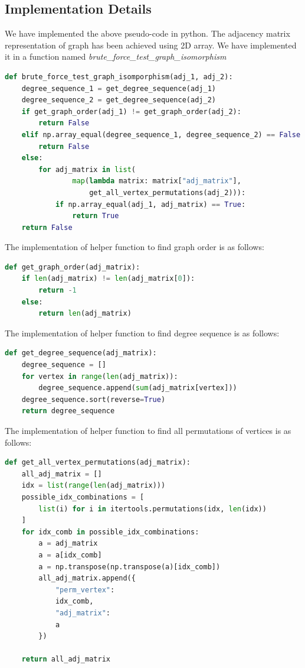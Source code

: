 \documentclass[11pt]{article}
\begin{document}
\subsection{Implementation Details}
\label{ssec:layout}
We have implemented the above pseudo-code in python. The adjacency matrix representation of graph has been achieved using 2D array. We have implemented it in a function named \textit{brute\_force\_test\_graph\_isomorphism}\\
\begin{lstlisting}[language=Python]
def brute_force_test_graph_isomporphism(adj_1, adj_2):
    degree_sequence_1 = get_degree_sequence(adj_1)
    degree_sequence_2 = get_degree_sequence(adj_2)
    if get_graph_order(adj_1) != get_graph_order(adj_2):
        return False
    elif np.array_equal(degree_sequence_1, degree_sequence_2) == False:
        return False
    else:
        for adj_matrix in list(
                map(lambda matrix: matrix["adj_matrix"],
                    get_all_vertex_permutations(adj_2))):
            if np.array_equal(adj_1, adj_matrix) == True:
                return True
    return False
\end{lstlisting}
The implementation of helper function to find graph order is as follows:
\begin{lstlisting}[language=Python]
def get_graph_order(adj_matrix):
    if len(adj_matrix) != len(adj_matrix[0]):
        return -1
    else:
        return len(adj_matrix)
\end{lstlisting}
The implementation of helper function to find degree sequence is as follows:
\begin{lstlisting}[language=Python]
def get_degree_sequence(adj_matrix):
    degree_sequence = []
    for vertex in range(len(adj_matrix)):
        degree_sequence.append(sum(adj_matrix[vertex]))
    degree_sequence.sort(reverse=True)
    return degree_sequence
\end{lstlisting}
The implementation of helper function to find all permutations of vertices is as follows:
\begin{lstlisting}[language=Python]
def get_all_vertex_permutations(adj_matrix):
    all_adj_matrix = []
    idx = list(range(len(adj_matrix)))
    possible_idx_combinations = [
        list(i) for i in itertools.permutations(idx, len(idx))
    ]
    for idx_comb in possible_idx_combinations:
        a = adj_matrix
        a = a[idx_comb]
        a = np.transpose(np.transpose(a)[idx_comb])
        all_adj_matrix.append({
            "perm_vertex":
            idx_comb,
            "adj_matrix":
            a
        })

    return all_adj_matrix
\end{lstlisting}
\end{document}
